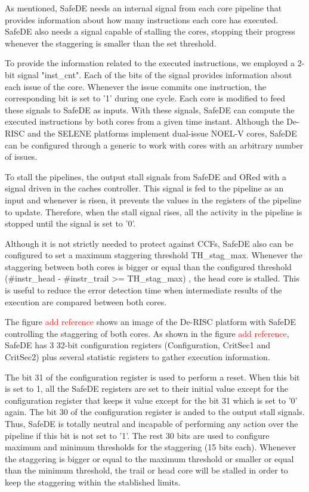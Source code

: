 As mentioned, SafeDE needs an internal signal from each core pipeline that provides information about how many instructions each core has executed. SafeDE also needs a signal capable of stalling the cores, stopping their progress whenever the staggering is smaller than the set threshold. 

To provide the information related to the executed instructions, we employed a 2-bit signal "inst\_cnt". Each of the bits of the signal provides information about each issue of the core. Whenever the issue commits one instruction, the corresponding bit is set to '1' during one cycle. Each core is modified to feed these signals to SafeDE as inputs. With these signals, SafeDE can compute the executed instructions by both cores from a given time instant. Although the De-RISC and the SELENE platforms implement dual-issue NOEL-V cores, SafeDE can be configured through a generic to work with cores with an arbitrary number of issues. 

To stall the pipelines, the output stall signals from SafeDE and ORed with a signal driven in the caches controller. This signal is fed to the pipeline as an input and whenever is risen, it prevents the values in the registers of the pipeline to update. Therefore, when the stall signal rises, all the activity in the pipeline is stopped until the signal is set to '0'.

Although it is not strictly needed to protect against CCFs, SafeDE also can be configured to set a maximum staggering threshold TH\_stag\_max. Whenever the staggering between both cores is bigger or equal than the configured threshold (\#instr\_head - \#instr\_trail >= TH\_stag\_max) , the head core is stalled. This is useful to reduce the error detection time when intermediate results of the execution are compared between both cores.

The figure \textcolor{red}{add reference} shows an image of the De-RISC platform with SafeDE controlling the staggering of both cores. As shown in the figure \textcolor{red}{add reference}, SafeDE has 3 32-bit configuration registers (Configuration, CritSec1 and CritSec2) plus several statistic registers to gather execution information.

The bit 31 of the configuration register is used to perform a reset. When this bit is set to 1, all the SafeDE registers are set to their initial value except for the configuration register that keeps it value except for the bit 31 which is set to '0' again. The bit 30 of the configuration register is anded to the output stall signals. Thus, SafeDE is totally neutral and incapable of performing any action over the pipeline if this bit is not set to '1'. The rest 30 bits are used to configure maximum and minimum thresholds for the staggering (15 bits each). Whenever the staggering is bigger or equal to the maximum threshold or smaller or equal than the minimum threshold, the trail or head core will be stalled in order to keep the staggering within the stablished limits.  

